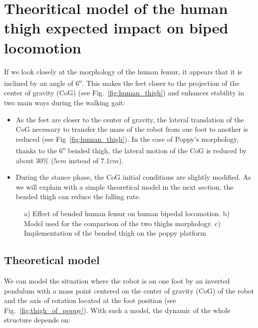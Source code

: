 \chapter{Theoritical model of the human thigh expected impact on biped locomotion} %
\label{appendix:thigh_model}



If we look closely at the morphology of the human femur, it appears that it is inclined by an angle of 6\textsuperscript{o}. This makes the feet closer to the projection of the center of gravity (CoG) (see Fig.~\ref{fig:human_thigh}) and enhances stability  in  two main ways  during the walking gait:

\begin{itemize}
    \item As the feet are closer to the center of gravity, the lateral translation of the CoG necessary to transfer the mass of the robot from one foot to another is reduced (see Fig~\ref{fig:human_thigh}). In the case of Poppy's morphology, thanks to the $6$\textsuperscript{o} bended thigh, the lateral motion of the CoG is reduced by about 30\% ($ 5 cm$ instead of $7.1 cm$).
    \item During the stance phase, the CoG initial conditions are slightly modified. As we will explain with a simple theoretical model in the next section, the bended thigh can reduce the falling rate.
\end{itemize}


\begin{figure}[tb]
\centering
    \hfil
    \hfil
    \caption{ a) Effect of bended human femur on human bipedal locomotion.
    b) Model used for the comparison of the two thighs morphology.
    c) Implementation of the bended thigh on the poppy platform}
    \label{fig:poppy_thigh}
\end{figure}

\section{Theoretical model} %
\label{sub:exp_theoritical_model}

We can model the situation where the robot is on one foot by an inverted pendulum with a mass point centered on the center of gravity (CoG) of the robot and the axis of rotation located at the foot position (see Fig.~\ref{fig:thigh_of_poppy}). With such a model, the dynamic of the whole structure depends on:

